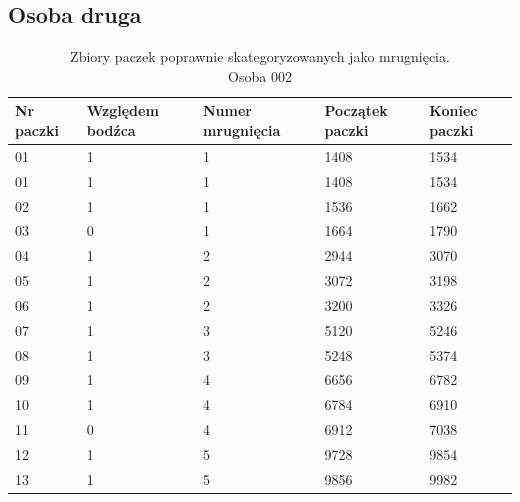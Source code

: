 \documentclass{article}
\begin{document}
        \subsection*{Osoba druga}
            \begin{table}[H]
                \captionsetup{justification=centering}
                \caption {Zbiory paczek poprawnie skategoryzowanych jako mrugnięcia. \\ Osoba 002}
                \begin{center}
                    \begin{tabular}{| p{1cm} | p{1.75cm} | p{1.75cm} | p{1.75cm} | p{1.75cm} |}
                        \hline
                        Nr paczki & Względem bodźca & Numer mrugnięcia & Początek paczki & Koniec paczki \\
                        \hline
                        \hline
                        01 & 1 & 1 & 1408 & 1534  \\
                        \hline
                        01 & 1 & 1 & 1408 & 1534  \\
                        \hline
                        02 & 1 & 1 & 1536 & 1662  \\
                        \hline
                        03 & 0 & 1 & 1664 & 1790  \\
                        \hline
                        04 & 1 & 2 & 2944 & 3070  \\
                        \hline
                        05 & 1 & 2 & 3072 & 3198  \\
                        \hline
                        06 & 1 & 2 & 3200 & 3326  \\
                        \hline
                        07 & 1 & 3 & 5120 & 5246  \\
                        \hline
                        08 & 1 & 3 & 5248 & 5374  \\
                        \hline
                        09 & 1 & 4 & 6656 & 6782  \\
                        \hline
                        10 & 1 & 4 & 6784 & 6910  \\
                        \hline
                        11 & 0 & 4 & 6912 & 7038  \\
                        \hline
                        12 & 1 & 5 & 9728 & 9854  \\
                        \hline
                        13 & 1 & 5 & 9856 & 9982  \\

\end{tabular}
\end{center}
\end{table}
\end{document}
